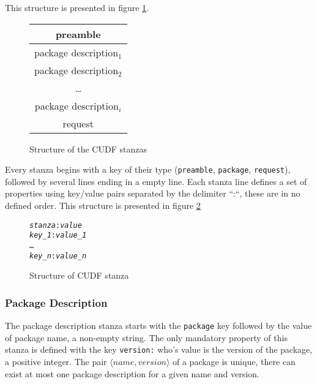 This structure is presented in figure \ref{formal:cudfstruct}.

\begin{figure}[htp]
\centering
\begin{tabular}{|c|}
\hline preamble \\ \hline
\hline package description$_{1}$ \\ \hline
\hline package description$_{2}$ \\ \hline
 \multicolumn{1}{c}{\ldots}  \\ 
\hline package description$_{i}$\\ \hline
\hline request\\ \hline
\end{tabular}
\caption{Structure of the CUDF stanzas}
\label{formal:cudfstruct}
\end{figure}

Every stanza begins with a key of their type (\verb+preamble+, \verb+package+, \verb+request+), followed by several lines ending in a empty line.
Each stanza line defines a set of properties using key/value pairs separated by the delimiter ``:``, these are in no defined order.
This structure is presented in figure \ref{formal.cudfstanza}

\begin{figure}[htp] 
\begin{center}
\begin{alltt}
\textit{stanza}: \textit{value}
\textit{key_1}: \textit{value_1}
\ldots
\textit{key_n}: \textit{value_n}
\end{alltt}
  \caption{Structure of  CUDF stanza}
  \label{formal.cudfstanza}
\end{center}
\end{figure}

\subsubsection{Package Description}
The package description stanza starts with the \verb+package+ key followed by the value of package name, a non-empty string.
The only mandatory property of this stanza is defined with the key \verb+version:+ who's value is the version of the package, a positive integer.
The pair $\langle name, version \rangle$ of a package is unique, there can exist at most one package description for a given name and version.

